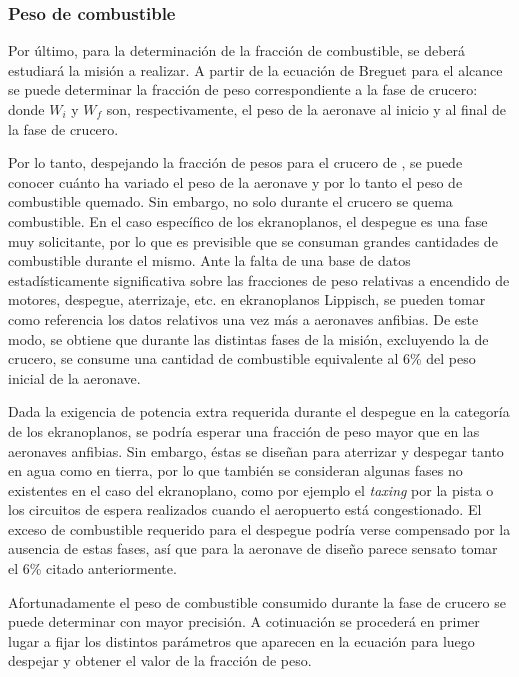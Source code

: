 \subsubsection{Peso de combustible}
\label{sec:design:weights:fuel}

Por último, para la determinación de la fracción de combustible, se deberá estudiará la misión a realizar. A partir de la ecuación de Breguet para el alcance se puede determinar la fracción de peso correspondiente a la fase de crucero:
donde $W_i$ y $W_f$ son, respectivamente, el peso de la aeronave al inicio y al final de la fase de crucero.

Por lo tanto, despejando la fracción de pesos para el crucero de , se puede conocer cuánto ha variado el peso de la aeronave y por lo tanto el peso de combustible quemado. Sin embargo, no solo durante el crucero se quema combustible. En el caso específico de los ekranoplanos, el despegue es una fase muy solicitante, por lo que es previsible que se consuman grandes cantidades de combustible durante el mismo. Ante la falta de una base de datos estadísticamente significativa sobre las fracciones de peso relativas a encendido de motores, despegue, aterrizaje, etc. en ekranoplanos Lippisch, se pueden tomar como referencia los datos relativos una vez más a aeronaves anfibias. De este modo, se obtiene que durante las distintas fases de la misión, excluyendo la de crucero, se consume una cantidad de combustible equivalente al 6\% del peso inicial de la aeronave.

Dada la exigencia de potencia extra requerida durante el despegue en la categoría de los ekranoplanos, se podría esperar una fracción de peso mayor que en las aeronaves anfibias. Sin embargo, éstas se diseñan para aterrizar y despegar tanto en agua como en tierra, por lo que también se consideran algunas fases no existentes en el caso del ekranoplano, como por ejemplo el \emph{taxing} por la pista o los circuitos de espera realizados cuando el aeropuerto está congestionado. El exceso de combustible requerido para el despegue podría verse compensado por la ausencia de estas fases, así que para la aeronave de diseño parece sensato tomar el 6\% citado anteriormente.

Afortunadamente el peso de combustible consumido durante la fase de crucero se puede determinar con mayor precisión. A cotinuación se procederá en primer lugar a fijar los distintos parámetros que aparecen en la ecuación  para luego despejar y obtener el valor de la fracción de peso.

